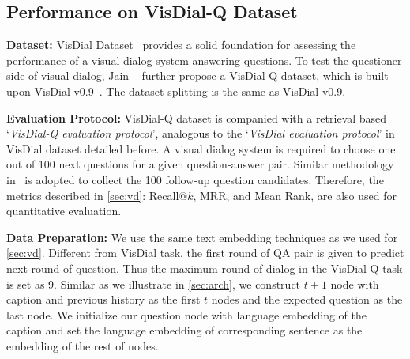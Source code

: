 \documentclass[10pt,twocolumn,letterpaper]{article}
\begin{document}
\subsection{Performance on VisDial-Q Dataset~\cite{das2017visual,jain2018two}} \label{sec:vq}
\vspace{-1pt}
\noindent\textbf{Dataset:} VisDial Dataset~\cite{das2017visual} provides a solid foundation for assessing the performance of a visual dialog system answering questions. To test the questioner side of visual dialog, Jain \etal~\cite{jain2018two} further propose a VisDial-Q dataset, which is built upon VisDial v0.9~\cite{das2017visual}. The dataset splitting is the same as VisDial v0.9.

\noindent\textbf{Evaluation Protocol:} VisDial-Q dataset is companied with a retrieval based `\textit{VisDial-Q evaluation protocol}', analogous to the `\textit{VisDial evaluation protocol}' in VisDial dataset detailed before. A visual dialog system is required to choose one out of 100 next questions for a given question-answer pair. Similar methodology in~\cite{das2017visual} is adopted to collect the 100 follow-up question candidates.
Therefore, the metrics described in \autoref{sec:vd}: Recall@$k$, MRR, and Mean Rank, are also used for quantitative evaluation.

\noindent\textbf{Data Preparation:} We use the same text embedding techniques as we used for \autoref{sec:vd}. Different from VisDial task, the first round of QA pair is given to predict next round of question. Thus the maximum round of dialog in the VisDial-Q task is set as 9. Similar as we illustrate in \autoref{sec:arch}, we construct $t\!+\!1$ node with caption and previous history as the first $t$ nodes and the expected question as the last node. We initialize our question node with language embedding of the caption and set the language embedding of corresponding sentence as the embedding of the rest of nodes.
\end{document}
